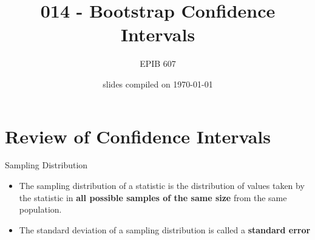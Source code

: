 \documentclass[10pt,handout]{beamer}\usepackage[]{graphicx}\usepackage[]{color}
\begin{document}
	
	
	
	
	\title{014 - Bootstrap Confidence Intervals}
	\author{EPIB 607}
	
	\date{slides compiled on \today}
	
	\maketitle


\section{Review of Confidence Intervals}

\begin{frame}{Sampling Distribution}
	
	\begin{definition}
		\begin{itemize}
			\item The sampling distribution of a statistic is the distribution of values taken by the statistic in \textbf{all possible samples of the same size} from the same population.
			\item The standard deviation of a sampling distribution is called a \textbf{standard error}
		\end{itemize} 
	\end{definition}
	
	
\end{frame}
\end{document}
